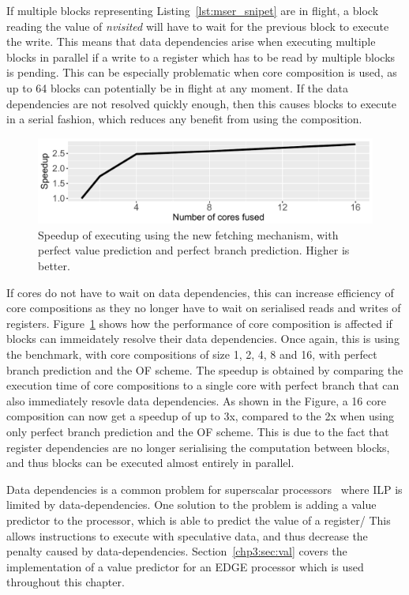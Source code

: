 If multiple blocks representing Listing~\ref{lst:mser_snipet} are in flight, a block reading the value of \textit{nvisited} will have to wait for the previous block to execute the write.
This means that data dependencies arise when executing multiple blocks in parallel if a write to a register which has to be read by multiple blocks is pending.
This can be especially problematic when core composition is used, as up to 64 blocks can potentially be in flight at any moment.
If the data dependencies are not resolved quickly enough, then this causes blocks to execute in a serial fashion, which reduces any benefit from using the composition.

\begin{figure}[t]
    \centering
    \includegraphics[width=1\textwidth]{chapter3/graphics/mser_motiv_reg.pdf}
    \caption{Speedup of executing  using the new fetching mechanism, with perfect value prediction and perfect branch prediction. Higher is better.}
    \label{fig:motivation_reg}
	\vspace{1em}
\end{figure}

If cores do not have to wait on data dependencies, this can increase efficiency of core compositions as they no longer have to wait on serialised reads and writes of registers.
Figure~\ref{fig:motivation_reg} shows how the performance of core composition is affected if blocks can immeidately resolve their data dependencies.
Once again, this is using the  benchmark, with core compositions of size 1, 2, 4, 8 and 16, with perfect branch prediction and the OF scheme.
The speedup is obtained by comparing the execution time of core compositions to a single core with perfect branch that can also immediately resovle data dependencies.
As shown in the Figure, a 16 core composition can now get a speedup of up to 3x, compared to the 2x when using only perfect branch prediction and the OF scheme.
This is due to the fact that register dependencies are no longer serialising the computation between blocks, and thus blocks can be executed almost entirely in parallel.

Data dependencies is a common problem for superscalar processors~\cite{peraisVTAGE2014} where ILP is limited by data-dependencies.
One solution to the problem is adding a value predictor to the processor, which is able to predict the value of a register/
This allows instructions to execute with speculative data, and thus decrease the penalty caused by data-dependencies.
Section~\ref{chp3:sec:val} covers the implementation of a value predictor for an EDGE processor which is used throughout this chapter.


